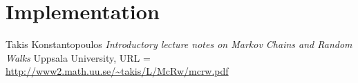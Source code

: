 \documentclass{article}
\begin{document}

\section{Implementation}

\begin{thebibliography}{1}

	 Takis Konstantopoulos {\em Introductory lecture notes on
	Markov Chains and Random Walks} Uppsala University, URL = \url{http://www2.math.uu.se/~takis/L/McRw/mcrw.pdf}
 
\end{thebibliography}
\end{document}
